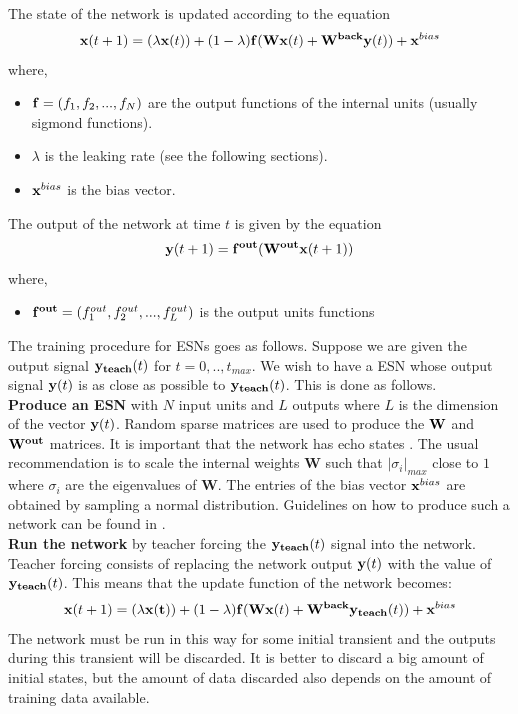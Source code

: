 \documentclass[letterpaper,9pt]{article}
\begin{document}
The state of the network is updated according to the equation
\begin{equation}
{\bf x}(t+1)= (\lambda {\bf x}(t)) + (1-\lambda){\bf f}({\bf Wx}(t) + {\bf W^{back}y}(t)) + {\bf x}^{bias}
\end{equation}
where,
\begin{itemize}
  \item ${\bf f}=(f_1,f_2,...,f_N)$ are the output functions of the internal units (usually sigmond functions).
  \item $\lambda$ is the leaking rate (see the following sections).
  \item ${\bf x}^{bias}$ is the bias vector.
\end{itemize}
The output of the network at time $t$ is given by the equation
\begin{equation}
{\bf y}(t+1)={\bf f^{out}}({\bf W^{out}}{\bf x}(t+1))
\end{equation}
where,
\begin{itemize}
  \item ${\bf f^{out}}=(f_1^{out},f_2^{out},...,f_L^{out})$ is the output units functions
\end{itemize}
The training procedure for ESNs goes as follows. Suppose we are given the output signal ${\bf y_{teach}}(t)$ for $t=0,..,t_{max}$. We wish to have a ESN whose output signal ${\bf y}(t)$ is as close as possible to ${\bf y_{teach}}(t)$. This is done as follows.\\

{\bf Produce an ESN} with $N$ input units and $L$ outputs where $L$ is the dimension of the vector ${\bf y}(t)$. Random sparse matrices are used to produce the ${\bf W}$ and ${\bf W^{out}}$ matrices. It is important that the network has echo states \cite{JaegerESNTutorial}. The usual recommendation is to scale the internal weights {\bf W} such that $|\sigma_i |_{max}$ close to $1$ where $\sigma_i$ are the eigenvalues of {\bf W}. The entries of the bias vector ${\bf x}^{bias}$ are obtained by sampling a normal distribution. Guidelines on how to produce such a network can be found in \cite{JaegerESNTutorial}.\\

{\bf Run the network} by teacher forcing the ${\bf y_{teach}}(t)$ signal into the network. Teacher forcing consists of replacing the network output ${\bf y}(t)$ with the value of ${\bf y_{teach}}(t)$. This means that the update function of the network becomes:
\begin{equation}
{\bf x}(t+1)= (\lambda {\bf x(t)}) + (1-\lambda){\bf f}({\bf Wx}(t) + {\bf W^{back}y_{teach}}(t)) + {\bf x}^{bias}
\end{equation}
The network must be run in this way for some initial transient and the outputs during this transient will be discarded. It is better to discard a big amount of initial states, but the amount of data discarded also depends on the amount of training data available. \pagebreak
\end{document}

